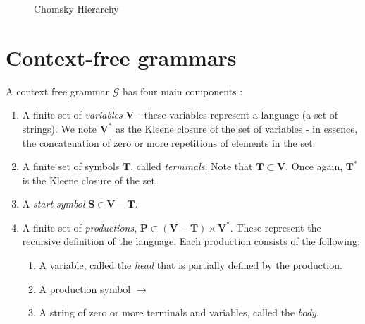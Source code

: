 \begin{figure}[h]
    \centering
    \caption{Chomsky Hierarchy}
    \label{fig:chomsky-fig}
\end{figure}

\section{Context-free grammars}

A context free grammar $\mathcal{G}$ has four main components \cite{hopcroft-automata}\cite{leeuwen-cfg}:
\begin{enumerate}
    \item A finite set of \emph{variables} $\mathbf{V}$ - these variables represent a language (a set of strings). We note $\mathbf{V}^*$ as the Kleene closure of the set of variables - in essence, the concatenation of zero or more repetitions of elements in the set.
    \item A finite set of symbols $\mathbf{T}$, called \emph{terminals}. Note that $\mathbf{T} \subset \mathbf{V}$. Once again, $\mathbf{T}^*$ is the Kleene closure of the set.
    \item A \emph{start symbol} $\mathbf{S} \in \mathbf{V}-\mathbf{T}$.
    \item A finite set of \emph{productions}, $\mathbf{P} \subset (\mathbf{V}-\mathbf{T})\times \mathbf{V}^*$. These represent the recursive definition of the language. Each production consists of the following:
    \begin{enumerate}
        \item A variable, called the \emph{head} that is partially defined by the production.
        \item A production symbol $\rightarrow$
        \item A string of zero or more terminals and variables, called the \emph{body}.
    \end{enumerate}
\end{enumerate}

